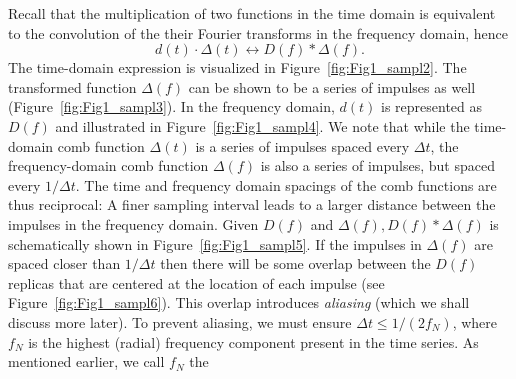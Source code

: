 Recall that the multiplication of two functions in 
the time domain is equivalent to the convolution of the their Fourier transforms in the frequency domain, 
hence
\noindent
\begin{equation}
d(t) \cdot \Delta (t) \leftrightarrow D(f) * \Delta (f).
\end{equation}	 
The time-domain expression is visualized in Figure~\ref{fig:Fig1_sampl2}.
\noindent
The transformed function $\Delta(f)$ can be shown to be a series of impulses as well (Figure~\ref{fig:Fig1_sampl3}).
\noindent
In the frequency domain, $d(t)$ is represented as $D(f)$ and illustrated in Figure~\ref{fig:Fig1_sampl4}.
We note that while the time-domain comb function $\Delta(t)$ is a series of impulses spaced every $\Delta t$,
the frequency-domain comb function $\Delta(f)$ is also a series of impulses, but spaced every $1/\Delta t$.
The time and frequency domain spacings of the comb
functions are thus reciprocal: A finer sampling interval leads to a larger distance between the impulses in the
frequency domain.
\noindent
Given $D(f)$ and $\Delta(f), D(f) * \Delta(f)$ is schematically shown in Figure~\ref{fig:Fig1_sampl5}.
\noindent
If the impulses in $\Delta(f)$ are spaced  closer than $1/\Delta t$ then there will be some overlap between the $D(f)$ replicas
that are centered at the location of each impulse (see Figure~\ref{fig:Fig1_sampl6}).
\noindent
This overlap introduces \emph{aliasing} (which we shall discuss more later).  To prevent aliasing, we must ensure $\Delta t \leq 1/(2 f_N)$,
where $f_N$ is the highest (radial) frequency component present in the time series.  As mentioned earlier, we call $f_N$ the
